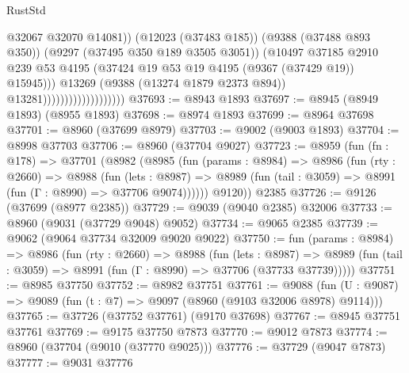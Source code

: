 \begin{lexlean}{RustStd}
\begin{coremodule}
                                                @32067
                                                @32070
                                                @14081))
                                            (@12023 (@37483 @185))
                                            (@9388 (@37488 @893 @350))
                                            (@9297 (@37495 @350 @189 @3505 @3051))
                                            (@10497
                                              @37185
                                              @2910
                                              @239
                                              @53
                                              @4195
                                              (@37424
                                                @19
                                                @53
                                                @19
                                                @4195
                                                (@9367 (@37429 @19))
                                                @15945)))
                                          @13269
                                          (@9388 (@13274 @1879 @2373 @894))
                                          @13281)))))))))))))))))))
@37693 := @8943 @1893
@37697 := @8945 (@8949 @1893) (@8955 @1893)
@37698 := @8974 @1893
@37699 := @8964 @37698
@37701 := @8960 (@37699 @8979)
@37703 := @9002 (@9003 @1893)
@37704 := @8998 @37703
@37706 := @8960 (@37704 @9027)
@37723 := @8959
    (fun (fn : @178) =>
    @37701
      (@8982
        (@8985
          (fun (params : @8984) =>
          @8986
            (fun (rty : @2660) =>
            @8988
              (fun (lets : @8987) =>
              @8989 (fun (tail : @3059) => @8991 (fun (Γ : @8990) => @37706 @9074))))))
        @9120))
    @2385
@37726 := @9126 (@37699 (@8977 @2385))
@37729 := @9039 (@9040 @2385) @32006
@37733 := @8960 (@9031 (@37729 @9048) @9052)
@37734 := @9065 @2385
@37739 := @9062 (@9064 @37734 @32009 @9020 @9022)
@37750 := fun (params : @8984) =>
  @8986
    (fun (rty : @2660) =>
    @8988
      (fun (lets : @8987) =>
      @8989 (fun (tail : @3059) => @8991 (fun (Γ : @8990) => @37706 (@37733 @37739)))))
@37751 := @8985 @37750
@37752 := @8982 @37751
@37761 := @9088
    (fun (U : @9087) => @9089 (fun (t : @7) => @9097 (@8960 (@9103 @32006 @8978) @9114)))
@37765 := @37726 (@37752 @37761) (@9170 @37698)
@37767 := @8945 @37751 @37761
@37769 := @9175 @37750 @7873
@37770 := @9012 @7873
@37774 := @8960 (@37704 (@9010 (@37770 @9025)))
@37776 := @37729 (@9047 @7873)
@37777 := @9031 @37776

\end{coremodule}
\end{lexlean}
